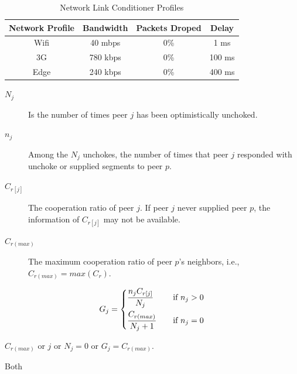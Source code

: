 \begin{table}[htb]
\centering
\normalsize
    \caption{Network Link Conditioner Profiles}
    \label{tab:network_profiles}
{\footnotesize
    \begin{tabular}{ | c | c | c | c | }
    \hline 
    \textbf{Network Profile}	& \textbf{Bandwidth} & \textbf{Packets Droped} & \textbf{Delay}\\ \hline \hline
    Wifi  & 40 mbps  &  0\%  &   1 ms \\ \hline
    3G  & 780 kbps  &  0\%  &   100 ms \\ \hline 
    Edge  & 240 kbps  &  0\%  &   400 ms \\ \hline
    \end{tabular}
    }
\end{table}

\begin{description}
  \item[$N_j$] Is the number of times peer $j$ has been optimistically unchoked.
  \item[$n_j$] Among the $N_j$ unchokes, the number of times that peer $j$ responded with unchoke or supplied segments to peer $p$.
  \item[$C_{r[j]}$] The cooperation ratio of peer $j$. If peer $j$ never supplied peer $p$, the information of $C_{r[j]}$ may not be available.
  \item[$C_{r (max)}$] The maximum cooperation ratio of peer $p$’s neighbors, i.e., $C_{r (max)} = max(C_r)$.
\end{description}

\begin{equation}
\label{unchoke_gain}
 G_j =
  \begin{dcases}
    \frac{n_j C_{r[j]}}{N_j} &\quad \text{if } n_j > 0\\
    \frac{C_{r (max)}}{N_j + 1} &\quad \text{if } n_j = 0
  \end{dcases}
\end{equation}

$C_{r (max)}$ or $j$ or $N_j = 0$ or $G_j = C_{r (max)}$.

Both 

